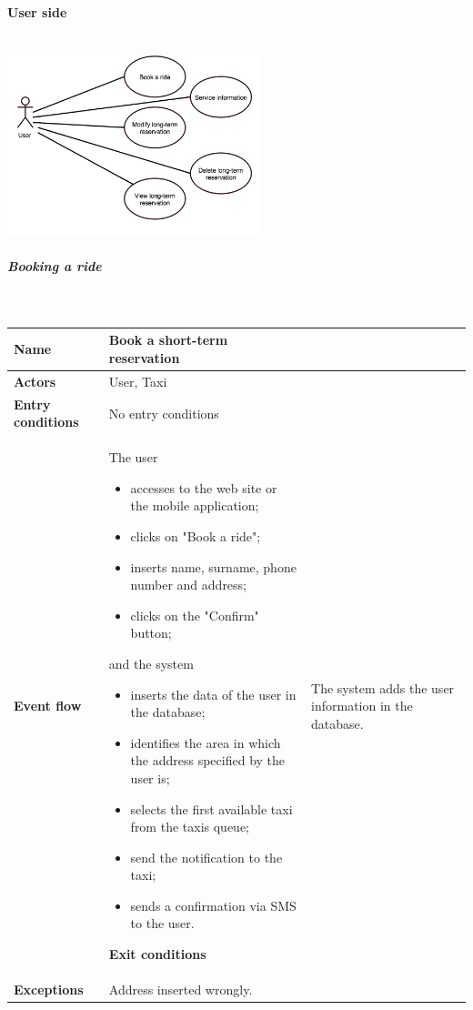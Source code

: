 \newpage
\paragraph{User side}
	\begin{center}
	~\\
\includegraphics[width=0.55\textwidth]{./images/UseCaseUser.png}~
	\end{center}
\subparagraph{Booking a ride}
~\\[0.2cm]
	\vspace{20pt}
\noindent
\begin{tabular}{l l}
 \textbf{Name} & Book a short-term reservation  \\ \hline
 \textbf{Actors} & User, Taxi \\ \hline
 \textbf{Entry conditions} & No entry conditions \\ \hline
 \textbf{Event flow} & 
 \parbox{0.7\textwidth}{
 The user
 \begin{itemize}
 \item accesses to the web site or the mobile application;
 \item clicks on "Book a ride";
 \item inserts name, surname, phone number and address;
 \item clicks on the "Confirm" button;
 \end{itemize}
 and the system
 \begin{itemize}
 \item inserts the data of the user in the database;
 \item identifies the area in which the address specified by the user is;
 \item selects the first available taxi from the taxis queue;
 \item send the notification to the taxi;
 \item sends a confirmation via SMS to the user.
 \end{itemize}
  }
  \textbf{Exit conditions} & \parbox{0.7\textwidth}{The system adds the user information in the database.} \\ \hline
  \textbf{Exceptions} & Address inserted wrongly.
 \end{tabular}
 
